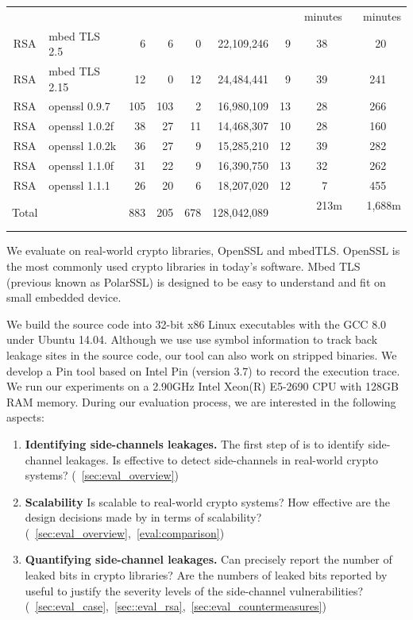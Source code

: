 \begin{table}
\begin{tabular}{clrrrrrrr}
&&&&&&& minutes & minutes\\\cline{8-9}
RSA & mbed TLS 2.5   & 6 & 6 & 0 & 22,109,246 & 9      & 38 ~~& 20  ~~\\
RSA & mbed TLS 2.15  & 12 & 0 & 12 & 24,484,441 & 9    & 39 ~~& 241  ~~\\
RSA & openssl 0.9.7  & 105 & 103 & 2 & 16,980,109 & 13 & 28 ~~& 266 ~~\\
RSA & openssl 1.0.2f & 38 & 27 & 11 & 14,468,307 & 10  & 28 ~~& 160  ~~\\
RSA & openssl 1.0.2k & 36 & 27 & 9 & 15,285,210 & 12   & 39 ~~& 282   ~~\\
RSA & openssl 1.1.0f & 31 & 22 & 9 & 16,390,750 & 13   & 32 ~~& 262 ~~\\
RSA & openssl 1.1.1  & 26 & 20 & 6 & 18,207,020 & 12   &  7 ~~& 455 ~~\\\hline
Total &              & 883 &205& 678& 128,042,089&     & 213m    ~~& 1,688m ~~\\\hline
\end{tabular}
\end{table}

We evaluate \tool{} on real-world crypto libraries, 
OpenSSL and mbedTLS. 
OpenSSL is the most commonly used
crypto libraries in today's software. 
Mbed TLS (previous known as PolarSSL) is designed to 
be easy to understand and fit on small embedded device.


We build the source code into 32-bit x86 Linux executables with the 
GCC 8.0 under Ubuntu 14.04. Although we use use symbol information to track
back leakage sites in the source code, our tool can also
work on stripped binaries. We develop a Pin tool based on Intel Pin (version 3.7)
to record the execution trace. We run our experiments on a 2.90GHz
Intel Xeon(R) E5-2690 CPU with 128GB RAM memory.
During our evaluation process, we are interested in the following 
aspects:
\begin{enumerate}
    \item  \textbf{Identifying side-channels leakages.}
    The first step of \tool{} is to identify side-channel leakages. 
    Is \tool{} effective to detect side-channels in real-world
    crypto systems? (~\ref{sec:eval_overview})
    \item  \textbf{Scalability} 
    Is \tool{} scalable to real-world crypto systems?
    How effective are
    the design decisions made by \tool{} in terms of scalability?  
    (~\ref{sec:eval_overview},~\ref{eval:comparison})
    \item  \textbf{Quantifying side-channel leakages.} 
    Can \tool{} precisely report the number of leaked bits in crypto libraries?
    Are the numbers of leaked bits reported by \tool{} useful to justify 
    the severity levels of the side-channel vulnerabilities? 
    (~\ref{sec:eval_case},~\ref{sec::eval_rsa},~\ref{sec:eval_countermeasures})
   
\end{enumerate}

